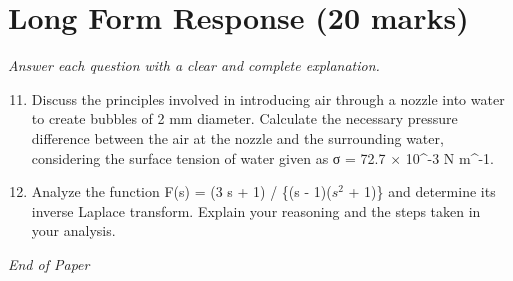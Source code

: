 \documentclass[12pt]{article}
\begin{document}
\section*{Long Form Response (20 marks)}
\textit{Answer each question with a clear and complete explanation.}
\begin{enumerate}[label=\arabic*.]
\setcounter{enumi}{10}
\item Discuss the principles involved in introducing air through a nozzle into water to create bubbles of 2 mm diameter. Calculate the necessary pressure difference between the air at the nozzle and the surrounding water, considering the surface tension of water given as σ = 72.7 \ensuremath{\times} 10^-3 N m^-1.
\item Analyze the function F(s) = (3 s + 1) / \{(s - 1)($s^2$ + 1)\} and determine its inverse Laplace transform. Explain your reasoning and the steps taken in your analysis.
\end{enumerate}

\vfill
\noindent\textit{End of Paper}
\end{document}
